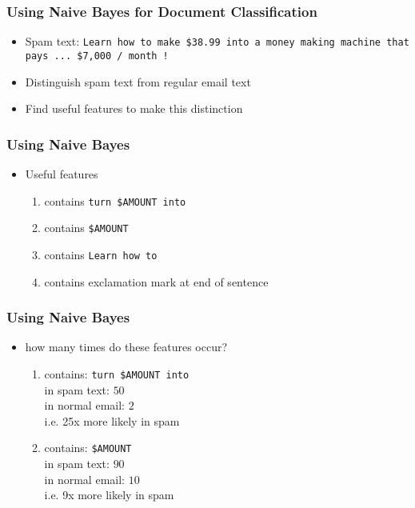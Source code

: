 \begin{frame}
\frametitle{Using Naive Bayes for Document Classification}
\begin{itemize}[<+->]
\item Spam text: {\tt Learn how to make \$38.99 into a money making machine that
  pays ... \$7,000 / month !}
\item Distinguish spam text from regular email text
\item Find useful features to make this distinction
\end{itemize}
\end{frame}

\begin{frame}
\frametitle{Using Naive Bayes}
\begin{itemize}[<+->]
\item Useful features
  \begin{enumerate}[<+->]
  \item contains {\tt turn \$AMOUNT into }
  \item contains {\tt \$AMOUNT}
  \item contains {\tt Learn how to }
  \item contains exclamation mark at end of sentence
  \end{enumerate}
\end{itemize}
\end{frame}

\begin{frame}
\frametitle{Using Naive Bayes}
\begin{itemize}[<+->]
\item how many times do these features occur?
  \begin{enumerate}[<+->]
  \item contains: {\tt turn \$AMOUNT into }\\
    in spam text: $50$ \\
    in normal email: $2$\\
    i.e. 25x more likely in spam
  \item contains: {\tt \$AMOUNT} \\
    in spam text: $90$ \\
    in normal email: $10$\\
    i.e. 9x more likely in spam
  \end{enumerate}
\end{itemize}
\end{frame}

